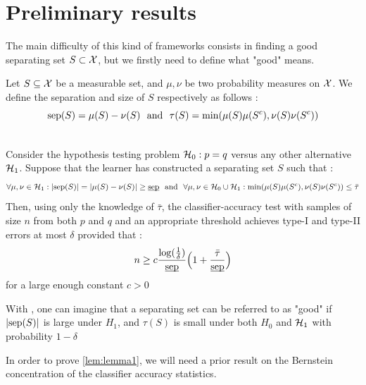 \section{Preliminary results } 
The main difficulty of this kind of frameworks consists in finding a good separating set $S \subset \mathcal{X}$, but we firstly need to define what "good" means. 
\begin{definition}
    Let $S \subseteq \mathcal{X}$ be a measurable set, and $\mu,\nu$ be two probability measures on $\mathcal{X}$. We define the separation and size of $S$ respectively as follows : 
    \begin{equation*}
        \text{sep}(S) = \mu(S)-\nu(S) \ \text{ and } \ \tau(S) = \min(\mu(S)\mu(S^c),\nu(S)\nu(S^c))
    \end{equation*}
\end{definition}
\begin{lemma}\label{lem:lemma1}\citet[Lemma~1]{gerberclas}\\
    Consider the hypothesis testing problem $\mathcal{H}_0 : p = q$ versus any other alternative $\mathcal{H}_1$. Suppose that the learner has constructed a separating set $S$ such that : 
    \begin{equation*}
        \forall \mu,\nu \in \mathcal{H}_1 : \left|\text{sep}(S)\right| = \left|\mu(S)-\nu(S)\right| \geq \underbar{$\text{sep}$} \ \text{ and }\ \forall\mu,\nu \in \mathcal{H}_0 \cup \mathcal{H}_1 : \min(\mu(S)\mu(S^c),\nu(S)\nu(S^c)) \leq \bar{\tau}
    \end{equation*}
    Then, using only the knowledge of $\bar{\tau}$, the classifier-accuracy test with samples of size $n$ from both $p$ and $q$ and an appropriate threshold achieves type-I and type-II errors at most $\delta$ provided that : 
    \begin{equation*}
        n \geq c\frac{\log(\frac{1}{\delta})}{\underbar{$\text{sep}$}}\Bigl(1+ \frac{\bar{\tau}}{\underbar{$\text{sep}$}}\Bigr)
    \end{equation*}
    for a large enough constant $c >0$
\end{lemma}
\begin{remark}
With , one can imagine that a separating set can be referred to as "good" if $\left|\text{sep}(S)\right|$ is large under $H_1$, and $\tau(S)$ is small under both $H_0$ and $\mathcal{H}_1$ with probability $1-\delta$
\end{remark}
In order to prove \cref{lem:lemma1}, we will need a prior result on the Bernstein concentration of the classifier accuracy statistics. 
